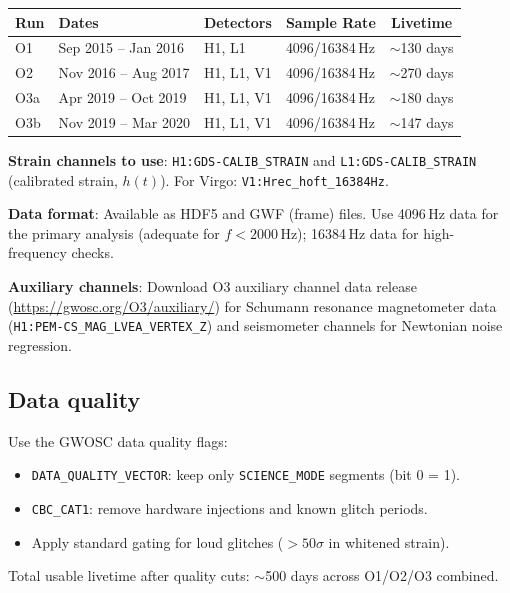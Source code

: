 \documentclass[11pt]{article}
\begin{document}
\begin{center}
\renewcommand{\arraystretch}{1.25}
\begin{tabular}{@{}llllc@{}}
\toprule
\textbf{Run} & \textbf{Dates} & \textbf{Detectors} & \textbf{Sample Rate} & \textbf{Livetime} \\
\midrule
O1 & Sep 2015 -- Jan 2016 & H1, L1 & 4096/16384\,Hz & $\sim$130 days \\
O2 & Nov 2016 -- Aug 2017 & H1, L1, V1 & 4096/16384\,Hz & $\sim$270 days \\
O3a & Apr 2019 -- Oct 2019 & H1, L1, V1 & 4096/16384\,Hz & $\sim$180 days \\
O3b & Nov 2019 -- Mar 2020 & H1, L1, V1 & 4096/16384\,Hz & $\sim$147 days \\
\bottomrule
\end{tabular}
\end{center}

\textbf{Strain channels to use}: \texttt{H1:GDS-CALIB\_STRAIN} and
\texttt{L1:GDS-CALIB\_STRAIN} (calibrated strain, $h(t)$).
For Virgo: \texttt{V1:Hrec\_hoft\_16384Hz}.

\textbf{Data format}: Available as HDF5 and GWF (frame) files.
Use 4096\,Hz data for the primary analysis (adequate for $f < 2000$\,Hz);
16384\,Hz data for high-frequency checks.

\textbf{Auxiliary channels}: Download O3 auxiliary channel data release
(\url{https://gwosc.org/O3/auxiliary/}) for Schumann resonance
magnetometer data (\texttt{H1:PEM-CS\_MAG\_LVEA\_VERTEX\_Z}) and
seismometer channels for Newtonian noise regression.

\subsection{Data quality}

Use the GWOSC data quality flags:
\begin{itemize}[nosep]
\item \texttt{DATA\_QUALITY\_VECTOR}: keep only \texttt{SCIENCE\_MODE}
  segments (bit 0 = 1).
\item \texttt{CBC\_CAT1}: remove hardware injections and known glitch
  periods.
\item Apply standard gating for loud glitches ($> 50\sigma$ in whitened
  strain).
\end{itemize}

Total usable livetime after quality cuts: $\sim$500 days across
O1/O2/O3 combined.

\end{document}
